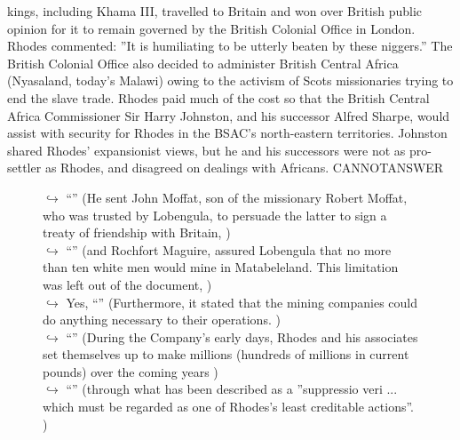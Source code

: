 \documentclass[11pt,a4paper, onecolumn]{article}
\begin{document}
kings, including Khama III, travelled to Britain and won over British public opinion for it to remain governed by the British Colonial Office in London. Rhodes commented: ''It is humiliating to be utterly beaten by these niggers.'' The British Colonial Office also decided to administer British Central Africa (Nyasaland, today's Malawi) owing to the activism of Scots missionaries trying to end the slave trade. Rhodes paid much of the cost so that the British Central Africa Commissioner Sir Harry Johnston, and his successor Alfred Sharpe, would assist with security for Rhodes in the BSAC's north-eastern territories. Johnston shared Rhodes' expansionist views, but he and his successors were not as pro-settler as Rhodes, and disagreed on dealings with Africans. CANNOTANSWER

\begin{figure}[t] \small \begin{tcolorbox}[boxsep=0pt,left=5pt,right=0pt,top=2pt,colback = yellow!5] \begin{dialogue}
 \small 
\colorbox{pink!25}{$\hookrightarrow$}
{ ``'' (He sent John Moffat, son of the missionary Robert Moffat, who was trusted by Lobengula, to persuade the latter to sign a treaty of friendship with Britain, ) }
\\
\colorbox{pink!25}{$\hookrightarrow$}
{ ``'' (and Rochfort Maguire, assured Lobengula that no more than ten white men would mine in Matabeleland. This limitation was left out of the document, ) }
\\
\colorbox{pink!25}{$\hookrightarrow$}
\colorbox{red!25}{Yes,}
{ ``'' (Furthermore, it stated that the mining companies could do anything necessary to their operations. ) }
\\
\colorbox{pink!25}{$\hookrightarrow$}
{ ``'' (During the Company's early days, Rhodes and his associates set themselves up to make millions (hundreds of millions in current pounds) over the coming years ) }
\\
\colorbox{pink!25}{$\hookrightarrow$}
{ ``'' (through what has been described as a ''suppressio veri ... which must be regarded as one of Rhodes's least creditable actions''. ) }
\\

\end{dialogue}
\end{tcolorbox}
\end{figure}
\end{document}
